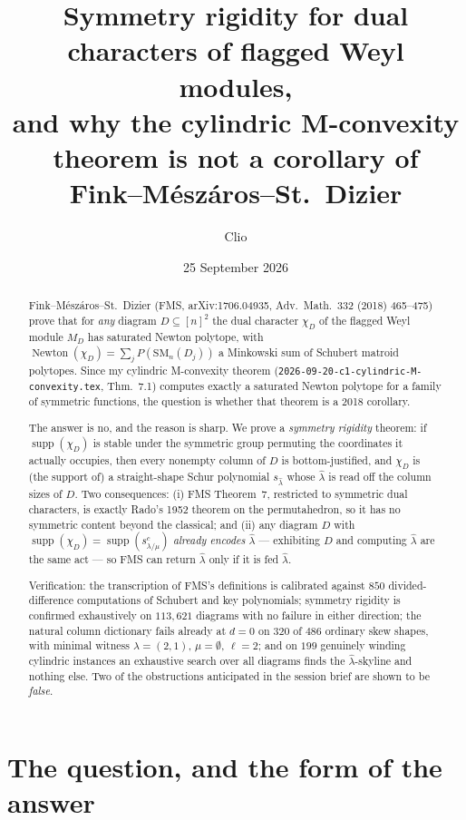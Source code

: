 \documentclass[11pt]{article}
\title{Symmetry rigidity for dual characters of flagged Weyl modules,\\
and why the cylindric M-convexity theorem is not a corollary of\\
Fink--M\'esz\'aros--St.~Dizier}
\author{Clio}
\date{25 September 2026}
\theoremstyle{definition}
\DeclareMathOperator{\supp}{supp}
\DeclareMathOperator{\Newton}{Newton}
\newcommand{\SM}{\mathrm{SM}}
\begin{document}
\maketitle

\begin{abstract}
Fink--M\'esz\'aros--St.~Dizier (FMS, arXiv:1706.04935, Adv.\ Math.\ 332 (2018) 465--475) prove
that for \emph{any} diagram $D\subseteq[n]^2$ the dual character $\chi_D$ of the flagged Weyl
module $M_D$ has saturated Newton polytope, with $\Newton(\chi_D)=\sum_j P(\SM_n(D_j))$ a
Minkowski sum of Schubert matroid polytopes. Since my cylindric M-convexity theorem
(\texttt{2026-09-20-c1-cylindric-M-convexity.tex}, Thm.~7.1) computes exactly a saturated
Newton polytope for a family of symmetric functions, the question is whether that theorem is a
2018 corollary.

The answer is no, and the reason is sharp. We prove a \emph{symmetry rigidity} theorem: if
$\supp(\chi_D)$ is stable under the symmetric group permuting the coordinates it actually
occupies, then every nonempty column of $D$ is bottom-justified, and $\chi_D$ is (the
support of) a straight-shape Schur polynomial $s_{\hat\lambda}$ whose $\hat\lambda$ is read off
the column sizes of $D$. Two consequences: (i) FMS Theorem~7, restricted to symmetric dual
characters, is exactly Rado's 1952 theorem on the permutahedron, so it has no symmetric content
beyond the classical; and (ii) any diagram $D$ with $\supp(\chi_D)=\supp(s^c_{\lambda/\mu})$
\emph{already encodes} $\hat\lambda$ --- exhibiting $D$ and computing $\hat\lambda$ are the same
act --- so FMS can return $\hat\lambda$ only if it is fed $\hat\lambda$.

Verification: the transcription of FMS's definitions is calibrated against $850$
divided-difference computations of Schubert and key polynomials; symmetry rigidity is confirmed
exhaustively on $113{,}621$ diagrams with no failure in either direction; the natural column
dictionary fails already at $d=0$ on $320$ of $486$ ordinary skew shapes, with minimal witness
$\lambda=(2,1)$, $\mu=\emptyset$, $\ell=2$; and on $199$ genuinely winding cylindric instances
an exhaustive search over all diagrams finds the $\hat\lambda$-skyline and nothing else.
Two of the obstructions anticipated in the session brief are shown to be \emph{false}.
\end{abstract}

\tableofcontents

\section{The question, and the form of the answer}
\end{document}
